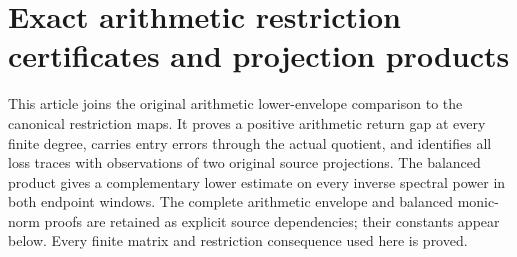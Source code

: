 \begingroup
\def\C{\mathbb C}
\def\R{\mathbb R}
\def\Tr{\operatorname{Tr}}
\def\diag{\operatorname{diag}}
\section{Exact arithmetic restriction certificates and projection products}

This article joins the original arithmetic lower-envelope comparison to
the canonical restriction maps. It proves a positive arithmetic return
gap at every finite degree, carries entry errors through the actual
quotient, and identifies all loss traces with observations of two
original source projections. The balanced product gives a complementary
lower estimate on every inverse spectral power in both endpoint windows.
The complete arithmetic envelope and balanced monic-norm proofs are
retained as explicit source dependencies; their constants appear below.
Every finite matrix and restriction consequence used here is proved.

